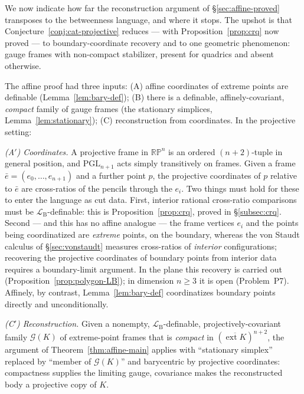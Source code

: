 \documentclass[11pt]{amsart}
\theoremstyle{definition}
\newcommand{\RP}{\mathbb{RP}}
\newcommand{\LB}{\mathcal{L}_{\mathrm{B}}}
\newcommand{\ext}{\operatorname{ext}}
\newcommand{\PGL}{\mathrm{PGL}}
\begin{document}
We now indicate how far the reconstruction argument of
\S\ref{sec:affine-proved} transposes to the betweenness language, and where it
stops. The upshot is that Conjecture~\ref{conj:cat-projective} reduces --- with
Proposition~\ref{prop:crq} now proved --- to boundary-coordinate recovery and
to one geometric phenomenon: gauge frames with non-compact stabilizer,
present for quadrics and absent otherwise.

The affine proof had three inputs: (A) affine coordinates of extreme points
are definable (Lemma~\ref{lem:bary-def}); (B) there is a definable,
affinely-covariant, \emph{compact} family of gauge frames (the stationary
simplices, Lemma~\ref{lem:stationary}); (C) reconstruction from coordinates.
In the projective setting:

\emph{(A$'$) Coordinates.} A projective frame in $\RP^n$ is an ordered
$(n+2)$-tuple in general position, and $\PGL_{n+1}$ acts simply transitively on
frames. Given a frame $\bar e=(e_0,\dots,e_{n+1})$ and a further point $p$, the
projective coordinates of $p$ relative to $\bar e$ are cross-ratios of the
pencils through the $e_i$. Two things must hold for these to enter the
language as cut data. First, interior rational cross-ratio comparisons must be
$\LB$-definable: this is Proposition~\ref{prop:crq}, proved in
\S\ref{subsec:crq}.
Second --- and this has no affine analogue --- the frame vertices $e_i$ and the
points being coordinatized are \emph{extreme} points, on the boundary, whereas
the von Staudt calculus of \S\ref{sec:vonstaudt} measures cross-ratios of
\emph{interior} configurations; recovering the projective coordinates of
boundary points from interior data requires a boundary-limit argument. In the
plane this recovery is carried out (Proposition~\ref{prop:polygon-LB}); in
dimension $n\ge3$ it is open (Problem~P7). Affinely, by contrast,
Lemma~\ref{lem:bary-def} coordinatizes boundary points directly and
unconditionally.

\emph{(C$'$) Reconstruction.} Given a nonempty, $\LB$-definable,
projectively-covariant family $\mathcal G(K)$ of extreme-point frames that is
\emph{compact} in $(\overline{\ext K})^{n+2}$, the argument of
Theorem~\ref{thm:affine-main} applies with ``stationary simplex'' replaced by
``member of $\mathcal G(K)$'' and barycentric by projective coordinates:
compactness supplies the limiting gauge, covariance makes the reconstructed
body a projective copy of $K$.
\end{document}
